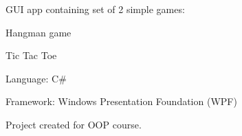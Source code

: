 G\+UI app containing set of 2 simple games\+:
\begin{DoxyItemize}
\item Hangman game
\item Tic Tac Toe
\end{DoxyItemize}

Language\+: C\#

Framework\+: Windows Presentation Foundation (W\+PF)

Project created for O\+OP course. 